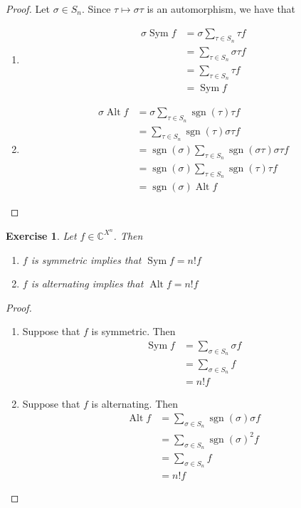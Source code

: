 \documentclass[12pt]{amsart}
\newtheorem{ex}[thm]{Exercise}
\newcommand{\sig}{\sigma}
\newcommand{\C}{\mathbb{C}}
\DeclareMathOperator{\alt}{Alt}
\DeclareMathOperator{\sym}{Sym}
\DeclareMathOperator{\sgn}{sgn}
\begin{document}
\begin{proof}Let $\sig \in S_n$. Since $\tau \mapsto \sig \tau$ is an automorphism, we have that
	\begin{enumerate}
		\item 
		\begin{align*}
			\sig \sym f 
			&= \sig \sum_{\tau \in S_n}  \tau f \\
			&=  \sum_{\tau \in S_n}  \sig \tau f \\
			&=  \sum_{\tau \in S_n}  \tau f \\ 
			&= \sym f
		\end{align*}
		\item 
		\begin{align*}
			\sig \alt f 
			&= \sig \sum_{\tau \in S_n}  \sgn(\tau) \tau f \\
			&=  \sum_{\tau \in S_n} \sgn(\tau) \sig \tau f \\
			&=  \sgn(\sig) \sum_{\tau \in S_n} \sgn(\sig \tau) \sig \tau f \\ 
			&= \sgn(\sig) \sum_{\tau \in S_n} \sgn( \tau) \tau f \\ 
			&= \sgn(\sig)\alt f
		\end{align*}
	\end{enumerate}
\end{proof}

\begin{ex}
	Let $f \in \C^{X^n}$. Then
	\begin{enumerate}
		\item $f$ is symmetric implies that $\sym f = n! f$
		\item  $f$ is alternating implies that $\alt f = n! f$
	\end{enumerate}
\end{ex}

\begin{proof}\
	\begin{enumerate}
		\item Suppose that $f$ is symmetric. Then 
		\begin{align*}
			\sym f 
			&= \sum_{\sig \in S_n} \sig f \\
			&= \sum_{\sig \in S_n} f \\
			&= n! f
		\end{align*}
	\item Suppose that $f$ is alternating. Then 
	\begin{align*}
		\alt f 
		&= \sum_{\sig \in S_n} \sgn(\sig) \sig f \\
		&= \sum_{\sig \in S_n} \sgn(\sig)^2 f \\
		&= \sum_{\sig \in S_n}  f \\
		&= n! f
	\end{align*}
	\end{enumerate}
\end{proof}
\end{document}
